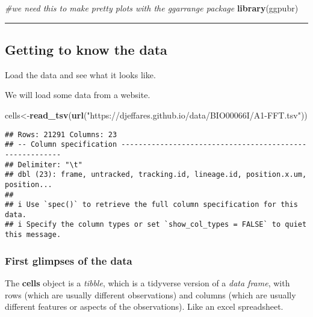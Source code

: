 \documentclass[
]{article}
\newenvironment{Shaded}{\begin{snugshade}}{\end{snugshade}}
\newcommand{\CommentTok}[1]{\textcolor[rgb]{0.56,0.35,0.01}{\textit{#1}}}
\newcommand{\FunctionTok}[1]{\textcolor[rgb]{0.13,0.29,0.53}{\textbf{#1}}}
\newcommand{\NormalTok}[1]{#1}
\newcommand{\OtherTok}[1]{\textcolor[rgb]{0.56,0.35,0.01}{#1}}
\newcommand{\StringTok}[1]{\textcolor[rgb]{0.31,0.60,0.02}{#1}}
\begin{document}
\begin{Shaded}
\begin{Highlighting}[]
\CommentTok{\#we need this to make pretty plots with the \textquotesingle{}ggarrange\textquotesingle{} package}
\FunctionTok{library}\NormalTok{(ggpubr)}
\end{Highlighting}
\end{Shaded}

\begin{center}\rule{0.5\linewidth}{0.5pt}\end{center}

\hypertarget{getting-to-know-the-data}{%
\subsection{Getting to know the data}\label{getting-to-know-the-data}}

Load the data and see what it looks like.

We will load some data from a website.

\begin{Shaded}
\begin{Highlighting}[]
\NormalTok{cells}\OtherTok{\textless{}{-}}\FunctionTok{read\_tsv}\NormalTok{(}\FunctionTok{url}\NormalTok{(}\StringTok{"https://djeffares.github.io/data/BIO00066I/A1{-}FFT.tsv"}\NormalTok{))}
\end{Highlighting}
\end{Shaded}

\begin{verbatim}
## Rows: 21291 Columns: 23
## -- Column specification --------------------------------------------------------
## Delimiter: "\t"
## dbl (23): frame, untracked, tracking.id, lineage.id, position.x.um, position...
## 
## i Use `spec()` to retrieve the full column specification for this data.
## i Specify the column types or set `show_col_types = FALSE` to quiet this message.
\end{verbatim}

\hypertarget{first-glimpses-of-the-data}{%
\subsubsection{First glimpses of the
data}\label{first-glimpses-of-the-data}}

The \textbf{cells} object is a \emph{tibble}, which is a tidyverse
version of a \emph{data frame}, with rows (which are usually different
observations) and columns (which are usually different features or
aspects of the observations). Like an excel spreadsheet.
\end{document}
